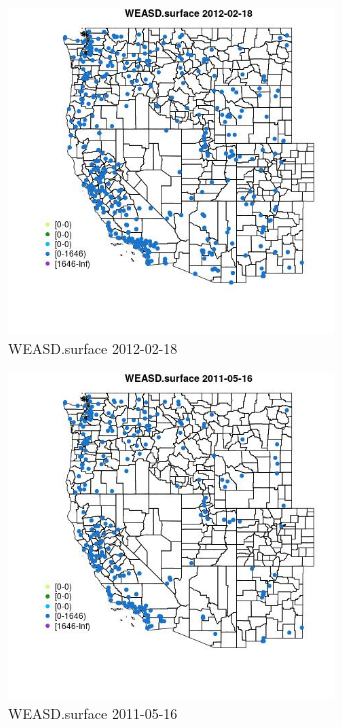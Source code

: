 \begin{figure} 
\centering  
\includegraphics[width=0.77\textwidth]{Code_Outputs/Report_ML_input_PM25_Step4_part_f_de_duplicated_aves_prioritize_24hr_obswNAs_MapObsWEASDsurface2012-02-18.jpg} 
\caption{\label{fig:Report_ML_input_PM25_Step4_part_f_de_duplicated_aves_prioritize_24hr_obswNAsMapObsWEASDsurface2012-02-18}WEASD.surface 2012-02-18} 
\end{figure} 
 

\begin{figure} 
\centering  
\includegraphics[width=0.77\textwidth]{Code_Outputs/Report_ML_input_PM25_Step4_part_f_de_duplicated_aves_prioritize_24hr_obswNAs_MapObsWEASDsurface2011-05-16.jpg} 
\caption{\label{fig:Report_ML_input_PM25_Step4_part_f_de_duplicated_aves_prioritize_24hr_obswNAsMapObsWEASDsurface2011-05-16}WEASD.surface 2011-05-16} 
\end{figure} 
 

